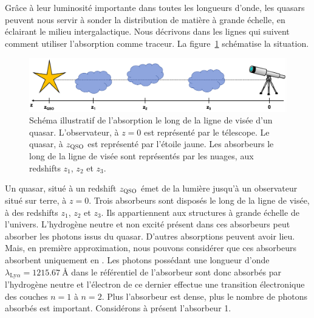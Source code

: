 Grâce à leur luminosité importante dans toutes les longueurs d'onde, les quasars peuvent nous servir à sonder la distribution de matière à grande échelle, en \og éclairant \fg le milieu intergalactique.
Nous décrivons dans les lignes qui suivent comment utiliser l'absorption \lya{} comme traceur.
La figure~\ref{fig:schema_lya} schématise la situation.
\begin{figure}
  \centering
  \includegraphics[scale=0.4]{schema_lya}
  \caption{Schéma illustratif de l'absorption le long de la ligne de visée d'un quasar. L'observateur, à $z=0$ est représenté par le télescope. Le quasar, à $z_{\textsc{QSO}}$ est représenté par l'étoile jaune. Les absorbeurs le long de la ligne de visée sont représentés par les nuages, aux redshifts $z_{1}$, $z_{2}$ et $z_{3}$.}
  \label{fig:schema_lya}
\end{figure}
Un quasar, situé à un redshift $z_{\textsc{QSO}}$ émet de la lumière jusqu'à un observateur situé sur terre, à $z=0$. Trois absorbeurs sont disposés le long de la ligne de visée, à des redshifts $z_1$, $z_2$ et $z_3$. Ils appartiennent aux structures à grande échelle de l'univers. L'hydrogène neutre et non excité présent dans ces absorbeurs peut absorber les photons issus du quasar.
D'autres absorptions peuvent avoir lieu. Mais, en première approximation, nous pouvons considérer que ces absorbeurs absorbent uniquement en \lya{}.
Les photons possédant une longueur d'onde $\lambda_{\mathrm{Ly}\alpha} = \SI{1215.67}{\angstrom}$ dans le référentiel de l'absorbeur sont donc absorbés par l'hydrogène neutre et l'électron de ce dernier effectue une transition électronique des couches $n=1$ à $n=2$. Plus l'absorbeur est dense, plus le nombre de photons absorbés est important. Considérons à présent l'absorbeur 1.
